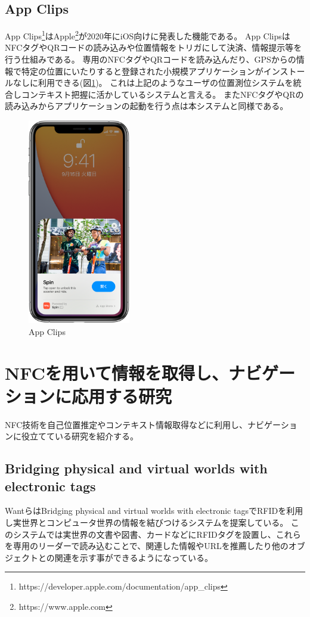 \subsection{App Clips}
App Clips\footnote{\textsf{https://developer.apple.com/documentation/app\_clips}}はApple\footnote{\textsf{https://www.apple.com}}が2020年にiOS向けに発表した機能である。
App ClipsはNFCタグやQRコードの読み込みや位置情報をトリガにして決済、情報提示等を行う仕組みである。
専用のNFCタグやQRコードを読み込んだり、GPSからの情報で特定の位置にいたりすると登録された小規模アプリケーションがインストールなしに利用できる(図\ref{fig:appClips})。
これは上記のようなユーザの位置測位システムを統合しコンテキスト把握に活かしているシステムと言える。
またNFCタグやQRの読み込みからアプリケーションの起動を行う点は本システムと同様である。

\begin{figure}[h]
  \centering 
  \includegraphics[height=90mm]{images/appClips.png}
  \caption{App Clips} \label{fig:appClips}
\end{figure}

\section{NFCを用いて情報を取得し、ナビゲーションに応用する研究}
NFC技術を自己位置推定やコンテキスト情報取得などに利用し、ナビゲーションに役立てている研究を紹介する。

\subsection{Bridging physical and virtual worlds with electronic tags}
WantらはBridging physical and virtual worlds with electronic tags\cite{10.1145/302979.303111}でRFIDを利用し実世界とコンピュータ世界の情報を結びつけるシステムを提案している。
このシステムでは実世界の文書や図書、カードなどにRFIDタグを設置し、これらを専用のリーダーで読み込むことで、関連した情報やURLを推薦したり他のオブジェクトとの関連を示す事ができるようになっている。

